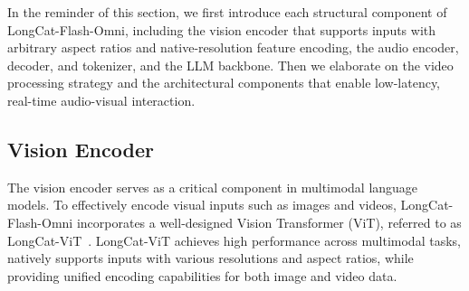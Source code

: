 \documentclass{article}
\newcommand{\longcat}{LongCat-Flash-Omni\xspace}
\begin{document}

In the reminder of this section, we first introduce each structural component of \longcat, including the vision encoder that supports inputs with arbitrary aspect ratios and native-resolution feature encoding, the audio encoder, decoder, and tokenizer, and the LLM backbone. Then we elaborate on the video processing strategy and the architectural components that enable low-latency, real-time audio-visual interaction.

\subsection{Vision Encoder} \label{sec:vision_encoder} %
The vision encoder serves as a critical component in multimodal language models. To effectively encode visual inputs such as images and videos, LongCat-Flash-Omni incorporates a well-designed Vision Transformer (ViT), referred to as LongCat-ViT~\citep{qiao2025univitar}. LongCat-ViT achieves high performance across multimodal tasks, natively supports inputs with various resolutions and aspect ratios, while providing unified encoding capabilities for both image and video data.
\end{document}
